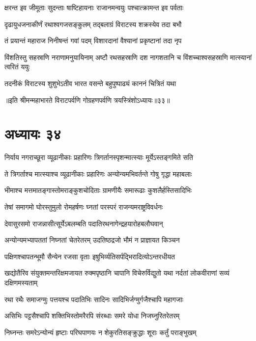 \twolineshloka
{क्षरन्त इव जीमूताः सुदन्ताः षाष्टिहायनाः}
{राजानमन्वयुः पश्चात्क्रामन्त इव पर्वताः}


\twolineshloka
{दृढायुधजनाकीर्णं रथाश्वगजसङ्कुलम्}
{तद्बलाग्रं विराटस्य शक्रस्येव तदा बभौ}


\twolineshloka
{तं प्रयान्तं महाराज निनीषन्तं गवां पदम्}
{विशारदानां वैश्यानां प्रकृष्टानां तदा नृप}


\threelineshloka
{विंशतिस्तु सहस्राणि नराणामनुयायिनाम्}
{अष्टौ रथसहस्राणि दश नागशतानि च}
{विंशच्चाश्वसहस्राणि मात्स्यानां त्वरितं ययुः}


\twolineshloka
{तदनीकं विराटस्य शुशुभेऽतीव भारत}
{वसन्ते बहुपुष्पाढ्यं काननं चित्रितं यथा}

॥इति श्रीमन्महाभारते विराटपर्वणि गोग्रहणपर्वणि त्रयस्त्रिंशोऽध्यायः॥३३॥

\chapter{अध्यायः ३४}

\twolineshloka
{निर्याय नगराच्छूरा व्यूढानीकाः प्रहारिणः}
{त्रिगर्तानस्पृशन्मात्स्याः मूर्येऽस्तङ्गमिते सति}


\twolineshloka
{ते त्रिगर्ताश्च मात्स्याश्च व्यूढानीकाः प्रहारिणः}
{अन्योन्यमभिवर्तन्ते गोषु गृद्धा महाबलाः}


\twolineshloka
{भीमाश्च मत्तमातङ्गास्तोमराङ्कुशचोदिताः}
{ग्रामणीयैः समारूढाः कुशलैर्हस्तिसादिभिः}


\twolineshloka
{तेषां समागमो घोरस्तुमुलो रोमहर्षणः}
{घ्नतां परस्परं राजन्यमराष्ट्रविवर्धनः}


\twolineshloka
{देवासुरसमो राजन्नासीत्सूर्येऽबलम्बति}
{पदातिरथनागेन्द्रहयारोहबलौघवान्}


\twolineshloka
{अन्योन्यमभ्यापततां निघ्नतां चेतरेतरम्}
{उदतिष्ठद्रजो भौमं न प्राज्ञायत किञ्चन}


\twolineshloka
{पक्षिणश्चापतन्भूमौ सैन्येन रजसा वृताः}
{इषुभिर्व्यतिसर्पद्भिरादित्योऽन्तरधीयत}


\onelineshloka
{खद्योतैरिव संयुक्तमन्तरिक्षमजायत}
\twolineshloka
{रुक्मपृष्ठानि चापानि विचेरुर्विद्युतो यथा}
{नर्दतां लोकवीराणां सव्यं दक्षिणमस्यताम्}


\twolineshloka
{रथा रथैः समाजग्मुः पत्तयश्च पदातिभिः}
{सादिनः सादिभिर्जग्मुर्गजैश्चापि महागजाः}


\twolineshloka
{असिभिः पट्टसैश्चापि शक्तिभिस्तोमरैरपि}
{संरब्धाः समरे योधा निजघ्नुरितरेतरम्}


\twolineshloka
{निघ्नन्तः समरेऽन्योन्यं हृष्टाः परिघपाणयः}
{न शेकुरतिसङ्क्रुद्धाः शूराः कर्तुं पराङ्भुखम्}


